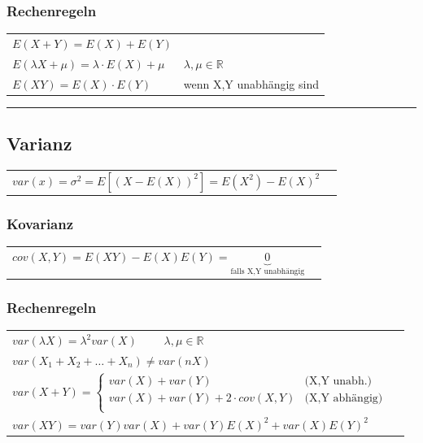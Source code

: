 		\subsubsection{Rechenregeln}
			\begin{tabular}{ll}
    		$E(X+Y)=E(X)+E(Y)$\\
    		$E(\lambda X + \mu)=\lambda \cdot E(X) + \mu$ & $\lambda, \mu \in \mathbb{R}$\\
    		$E(XY) = E(X)\cdot E(Y)$ & wenn X,Y unabhängig sind\\
    		\end{tabular}

\vspace{1mm}
\hrule
\vspace{2mm}

	\begin{minipage}{9cm}
	\subsection{Varianz  }
		\begin{tabular}{ll}
		$var(x)=\sigma ^2=E[(X-E(X))^2]=E(X^2)-E(X)^2$\\
		\end{tabular}

		\subsubsection{Kovarianz }
		\begin{tabular}{ll}
        $cov(X,Y)=E(XY)-E(X)E(Y)=\underbrace{0}_{\text{falls X,Y unabhängig}}$
        \end{tabular}
	\end{minipage}
		\begin{minipage}{9cm}
		\subsubsection{Rechenregeln}
			\begin{tabular}{ll}
        	$var(\lambda X)=\lambda^2 var(X) \qquad $ $\lambda, \mu \in
        	\mathbb{R}$\\ 
        	$var(X_1+X_2+\ldots+X_n) \neq var(n X)$ \\
        	$var(X+Y)= \begin{cases}
	                      var(X)+var(Y)
	                      &	\text{(X,Y unabh.)}\\                     
	                      var(X) + var(Y) + 2 \cdot cov(X,Y) 
	                      &	\text{(X,Y abhängig)}\\
                     \end{cases} $ \\
        	$var(X Y)= var(Y)var(X)+var(Y)E(X)^2+var(X)E(Y)^2$
        	\end{tabular}
		\end{minipage}
\vspace{1mm}

